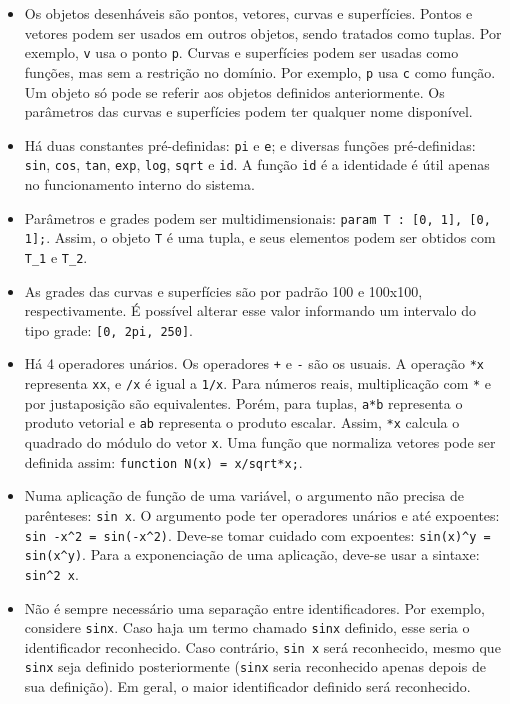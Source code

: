 \begin{itemize}
\item
Os objetos desenháveis são pontos, vetores, curvas e superfícies.
Pontos e vetores podem ser usados em outros objetos, sendo tratados como tuplas.
Por exemplo, \texttt{v} usa o ponto \texttt{p}.
Curvas e superfícies podem ser usadas como funções, mas sem a restrição no domínio.
Por exemplo, \texttt{p} usa \texttt{c} como função.
Um objeto só pode se referir aos objetos definidos anteriormente.
Os parâmetros das curvas e superfícies podem ter qualquer nome disponível.

\item
Há duas constantes pré-definidas: \texttt{pi} e \texttt{e};
e diversas funções pré-definidas:
\texttt{sin}, \texttt{cos}, \texttt{tan},
\texttt{exp}, \texttt{log}, \texttt{sqrt} e \texttt{id}.
A função \texttt{id} é a identidade é útil apenas no funcionamento interno do sistema.

\item
Parâmetros e grades podem ser multidimensionais:
\texttt{param T : [0, 1], [0, 1];}. Assim, o objeto \texttt{T} é uma tupla,
e seus elementos podem ser obtidos com \texttt{T\_1} e \texttt{T\_2}.

\item As grades das curvas e superfícies são por padrão 100 e 100x100, respectivamente.
É possível alterar esse valor informando um intervalo do
tipo grade: \texttt{[0, 2pi, 250]}.

\item
Há 4 operadores unários. Os operadores \texttt{+} e \texttt{-} são os usuais.
A operação \texttt{*x} representa \texttt{xx}, e \texttt{/x} é igual a \texttt{1/x}.
Para números reais, multiplicação com \texttt{*} e por justaposição são equivalentes.
Porém, para tuplas, \texttt{a*b} representa o produto vetorial
e \texttt{ab} representa o produto escalar.
Assim, \texttt{*x} calcula o quadrado do módulo do vetor \texttt{x}.
Uma função que normaliza vetores pode ser
definida assim: \texttt{function N(x) = x/sqrt*x;}.

\item
Numa aplicação de função de uma variável, o argumento não precisa de parênteses:
\texttt{sin x}.
O argumento pode ter operadores unários e até expoentes:
\texttt{sin -x\textasciicircum2 = sin(-x\textasciicircum2)}.
Deve-se tomar cuidado com expoentes:
\texttt{sin(x)\textasciicircum y = sin(x\textasciicircum y)}.
Para a exponenciação de uma aplicação,
deve-se usar a sintaxe: \texttt{sin\textasciicircum2 x}.

\item
Não é sempre necessário uma separação entre identificadores.
Por exemplo, considere \texttt{sinx}.
Caso haja um termo chamado \texttt{sinx} definido, esse seria o
identificador reconhecido.
Caso contrário, \texttt{sin x} será reconhecido,
mesmo que \texttt{sinx} seja definido posteriormente
(\texttt{sinx} seria reconhecido apenas depois de sua definição).
Em geral, o maior identificador definido será reconhecido.
\end{itemize}

